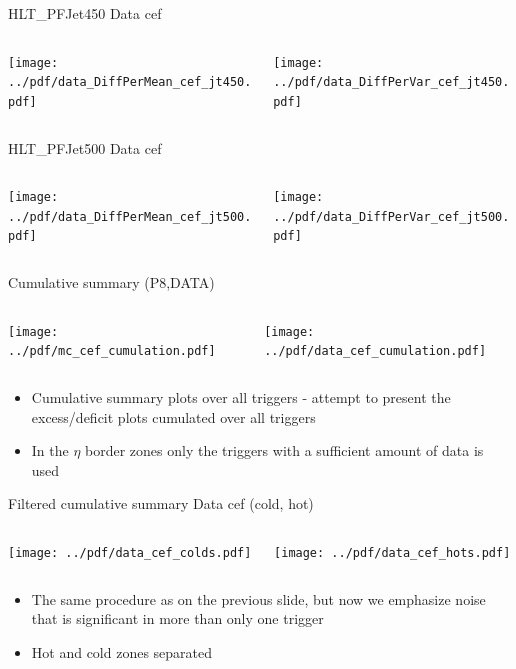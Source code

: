 \documentclass[9pt]{beamer}
\begin{document}
\begin{frame}[t]{HLT\_PFJet450 Data cef}
\begin{columns}[T]
  \begin{column}{.5\textwidth}
  \texttt{[image: ../pdf/data\_DiffPerMean\_cef\_jt450.pdf]}
  \end{column}
  \begin{column}{.5\textwidth}
  \texttt{[image: ../pdf/data\_DiffPerVar\_cef\_jt450.pdf]}
  \end{column}
\end{columns}
\end{frame}

\begin{frame}[t]{HLT\_PFJet500 Data cef}
\begin{columns}[T]
  \begin{column}{.5\textwidth}
  \texttt{[image: ../pdf/data\_DiffPerMean\_cef\_jt500.pdf]}
  \end{column}
  \begin{column}{.5\textwidth}
  \texttt{[image: ../pdf/data\_DiffPerVar\_cef\_jt500.pdf]}
  \end{column}
\end{columns}
\end{frame}

\begin{frame}[t]{Cumulative summary (P8,DATA)}
\begin{columns}[T]
  \begin{column}{.5\textwidth}
  \texttt{[image: ../pdf/mc\_cef\_cumulation.pdf]}
  \end{column}
  \begin{column}{.5\textwidth}
  \texttt{[image: ../pdf/data\_cef\_cumulation.pdf]}
  \end{column}
\end{columns}
\begin{itemize}
 \item Cumulative summary plots over all triggers - attempt to present the excess/deficit plots cumulated over all triggers
 \item In the $\eta$ border zones only the triggers with a sufficient amount of data is used
\end{itemize}
\end{frame}

\begin{frame}[t]{Filtered cumulative summary Data cef (cold, hot)}
\begin{columns}[T]
  \begin{column}{.5\textwidth}
  \texttt{[image: ../pdf/data\_cef\_colds.pdf]}
  \end{column}
  \begin{column}{.5\textwidth}
  \texttt{[image: ../pdf/data\_cef\_hots.pdf]}
  \end{column}
\end{columns}
\begin{itemize}
 \item The same procedure as on the previous slide, but now we emphasize noise that is significant in more than only one trigger
 \item Hot and cold zones separated
\end{itemize}
\end{frame}
\end{document}
